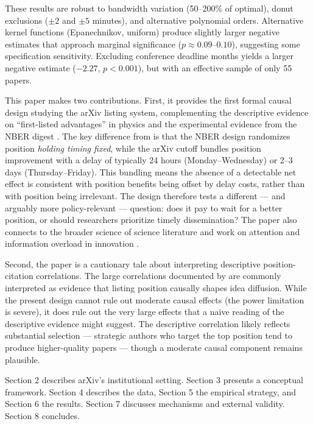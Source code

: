 \documentclass[12pt]{article}
\begin{document}
These results are robust to bandwidth variation (50--200\% of optimal), donut exclusions ($\pm 2$ and $\pm 5$ minutes), and alternative polynomial orders. Alternative kernel functions (Epanechnikov, uniform) produce slightly larger negative estimates that approach marginal significance ($p \approx 0.09$--$0.10$), suggesting some specification sensitivity. Excluding conference deadline months yields a larger negative estimate ($-2.27$, $p < 0.001$), but with an effective sample of only 55 papers.

This paper makes two contributions. First, it provides the first formal causal design studying the arXiv listing system, complementing the descriptive evidence on ``first-listed advantages'' in physics \citep{dietrich2008, haque2009, haque2010} and the experimental evidence from the NBER digest \citep{feenberg2017}. The key difference from \citet{feenberg2017} is that the NBER design randomizes position \textit{holding timing fixed}, while the arXiv cutoff bundles position improvement with a delay of typically 24 hours (Monday--Wednesday) or 2--3 days (Thursday--Friday). This bundling means the absence of a detectable net effect is consistent with position benefits being offset by delay costs, rather than with position being irrelevant. The design therefore tests a different --- and arguably more policy-relevant --- question: does it pay to wait for a better position, or should researchers prioritize timely dissemination? The paper also connects to the broader science of science literature \citep{fortunato2018, sinatra2016, wang2013} and work on attention and information overload in innovation \citep{jones2009, bloom2020, azoulay2014}.

Second, the paper is a cautionary tale about interpreting descriptive position-citation correlations. The large correlations documented by \citet{haque2009, haque2010} are commonly interpreted as evidence that listing position causally shapes idea diffusion. While the present design cannot rule out moderate causal effects (the power limitation is severe), it does rule out the very large effects that a naive reading of the descriptive evidence might suggest. The descriptive correlation likely reflects substantial selection --- strategic authors who target the top position tend to produce higher-quality papers --- though a moderate causal component remains plausible.

Section 2 describes arXiv's institutional setting. Section 3 presents a conceptual framework. Section 4 describes the data, Section 5 the empirical strategy, and Section 6 the results. Section 7 discusses mechanisms and external validity. Section 8 concludes.
\end{document}
